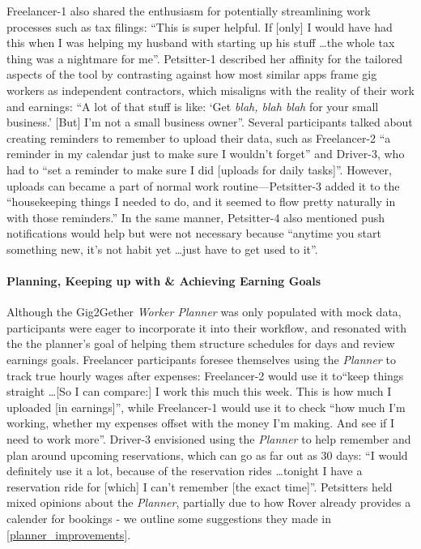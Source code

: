 Freelancer-1 also shared the enthusiasm for potentially streamlining work processes such as tax filings: ``This is super helpful. If [only] I would have had this when I was helping my husband with starting up his stuff \dots the whole tax thing was a nightmare for me''.
Petsitter-1 described her affinity for the tailored aspects of the tool by contrasting against how most similar apps frame gig workers as independent contractors, which misaligns with the reality of their work and earnings: ``A lot of that stuff is like: `Get \textit{blah, blah blah} for your small business.' [But] I'm not a small business owner''. 
Several participants talked about creating reminders to remember to upload their data, such as Freelancer-2 ``a reminder in my calendar just to make sure I wouldn't forget'' and Driver-3, who had to ``set a reminder to make sure I did [uploads for daily tasks]''.
However, uploads can became a part of normal work routine---Petsitter-3 added it to the ``housekeeping things I needed to do, and it seemed to flow pretty naturally in with those reminders.'' In the same manner, Petsitter-4 also mentioned push notifications would help but were not necessary because ``anytime you start something new, it's not habit yet \dots just have to get used to it''.

\paragraph{\textbf{{Planning, Keeping up with \& Achieving Earning Goals}}} Although the Gig2Gether \textit{Worker Planner} was only populated with mock data, participants were eager to incorporate it into their workflow{, and} resonated with the the planner's goal of helping them structure schedules for days and review earnings goals. Freelancer participants foresee themselves using the \textit{Planner} to track true hourly wages after expenses: Freelancer-2 would use it to``keep things straight \dots [So I can compare:] I work this much this week. This is how much I uploaded [in earnings]'', while Freelancer-1 would use it to check ``how much I'm working, whether my expenses offset with the money I'm making. And see if I need to work more''. Driver-3 envisioned using the \textit{Planner} to help remember and plan around upcoming reservations, which can go as far out as 30 days:
``I would definitely use it a lot, because of the reservation rides \dots tonight I have a reservation ride for [which] I can't remember [the exact time]''. Petsitters held mixed opinions about the \textit{Planner}, partially due to how Rover already provides a calender for bookings - we outline some suggestions they made in \ref{planner_improvements}.

